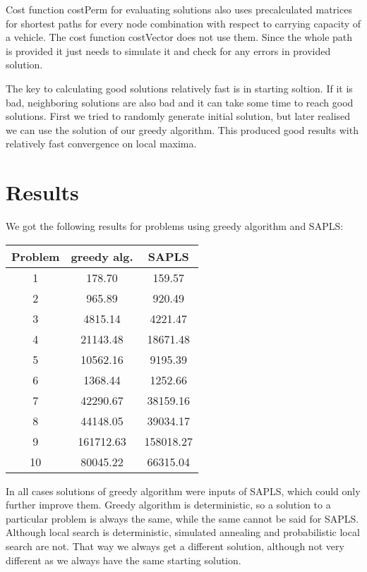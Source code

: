 \documentclass[a4paper, 12pt]{article}
\begin{document}
Cost function {\sf costPerm} for evaluating solutions also uses
precalculated matrices for shortest paths for every node combination with
respect to carrying capacity of a vehicle. The cost function {\sf costVector}
does not use them. Since the whole path is provided it just needs to simulate
it and check for any errors in provided solution.

The key to calculating good solutions relatively fast is in starting soltion.
If it is bad, neighboring solutions are also bad and it can take some time to
reach good solutions. First we tried to randomly generate initial solution, but
later realised we can use the solution of our greedy algorithm. This produced
good results with relatively fast convergence on local maxima.

\section{Results}

We got the following results for problems using greedy algorithm and SAPLS:
\begin{center}
\begin{tabular}{ c|cc }
	Problem & greedy alg. & SAPLS \\
	\hline
	1 & 178.70 & 159.57 \\
	2 & 965.89 & 920.49 \\
	3 & 4815.14 & 4221.47 \\
	4 & 21143.48 & 18671.48 \\
	5 & 10562.16 & 9195.39 \\
	6 & 1368.44 & 1252.66 \\
	7 & 42290.67 & 38159.16 \\
	8 & 44148.05 & 39034.17 \\
	9 & 161712.63 & 158018.27 \\
	10 & 80045.22 & 66315.04 \\
\end{tabular}
\end{center}

In all cases solutions of greedy algorithm were inputs of SAPLS, which could
only further improve them. Greedy algorithm is deterministic, so a solution to
a particular problem is always the same, while the same cannot be said for SAPLS.
Although local search is deterministic, simulated annealing and probabilistic
local search are not. That way we always get a different solution, although not
very different as we always have the same starting solution.
\end{document}
